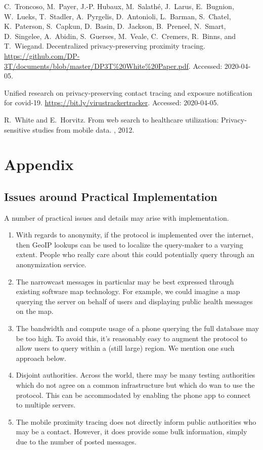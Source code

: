 \begin{thebibliography}{10}
C.~Troncoso, M.~Payer, J.-P. Hubaux, M.~Salath\'{e}, J.~Larus, E.~Bugnion,
  W.~Lueks, T.~Stadler, A.~Pyrgelis, D.~Antonioli, L.~Barman, S.~Chatel,
  K.~Paterson, S.~Capkun, D.~Basin, D.~Jackson, B.~Preneel, N.~Smart,
  D.~Singelee, A.~Abidin, S.~Guerses, M.~Veale, C.~Cremers, R.~Binns, and
  T.~Wiegand.
\newblock Decentralized privacy-preserving proximity tracing.
\newblock
  \url{https://github.com/DP-3T/documents/blob/master/DP3T\%20White\%20Paper.pdf}.
\newblock Accessed: 2020-04-05.

Unified research on privacy-preserving contact tracing and exposure
  notification for covid-19.
\newblock \url{https://bit.ly/virustrackertracker}.
\newblock Accessed: 2020-04-05.

R.~White and E.~Horvitz.
\newblock From web search to healthcare utilization: Privacy-sensitive studies
  from mobile data.
, 2012.

\end{thebibliography}


\newpage

\section*{Appendix}

\subsection{Issues around Practical Implementation}

A number of practical issues and details may arise with implementation.
\begin{enumerate}
    \item With regards to anonymity, if the protocol is implemented over the internet, then GeoIP lookups can be used to localize the query-maker to a varying extent.  People who really care about this could potentially query through an anonymization service.
    \item The narrowcast messages in particular may be best expressed through existing software map technology.   For example, we could imagine a map querying the server on behalf of users and displaying public health messages on the map.  
    \item The bandwidth and compute usage of a phone querying the full database may be too high.  To avoid this, it's reasonably easy to augment the protocol to allow users to query within a (still large) region.  We mention one such approach below.  
    \item Disjoint authorities.  Across the world, there may be many testing authorities which do not agree on a common infrastructure but which do wan to use the protocol.  This can be accommodated by enabling the phone app to connect to multiple servers. 
    \item The mobile proximity tracing does not directly inform public authorities who may be a contact.  However, it does provide some bulk information, simply due to the number of posted messages. 
\end{enumerate}

